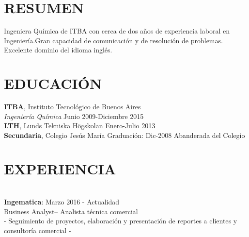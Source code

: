 \documentclass[margin]{res}
\begin{document}
\begin{resume}

\section{RESUMEN}
Ingeniera Química de ITBA con cerca de dos años de experiencia laboral en Ingeniería.Gran capacidad de comunicación y de resolución de problemas. Excelente dominio del idioma inglés.
\section{EDUCACIÓN}
\textbf{ITBA}, Instituto Tecnológico de Buenos Aires\\
{\sl Ingeniería Química} \hfill Junio 2009-Diciembre 2015
\\
\textbf{LTH}, Lunds Tekniska Högskolan \hfill Enero-Julio 2013
\\
\textbf{Secundaria}, Colegio Jesús María \hfill Graduación: Dic-2008
Abanderada del Colegio

\section{EXPERIENCIA}
\section{}
\par
\textbf{Ingematica}: \hfill Marzo 2016 - Actualidad
\\Business Analyst– Analista técnica comercial
\\- Seguimiento de proyectos, elaboración y presentación de reportes a clientes y consultoría comercial -
\section{}


\end{resume}
\end{document}
